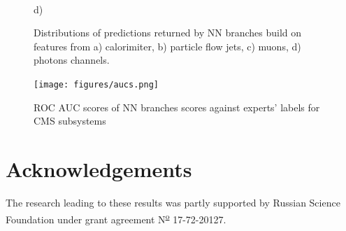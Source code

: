 \documentclass[a4paper]{jpconf}
\begin{document}
\begin{figure}[H]
\begin{minipage}[h!]{0.47\linewidth}
\end{minipage}
\hfill
\begin{minipage}[h!]{0.47\linewidth}
 \\ d) 
\end{minipage}
\caption{Distributions of predictions returned by NN branches build on features from a) calorimiter, b) particle flow jets, c) muons, d) photons
channels.}
\label{ris:experimentalcorrelationsignals}
\end{figure}


\begin{figure}[H]
\begin{center}
\texttt{[image: figures/aucs.png]}
\end{center}
\caption{\label{label}ROC AUC scores of NN branches scores against experts' labels for CMS subsystems}
\end{figure}

\section*{Acknowledgements}
The research leading to these results was partly supported by Russian Science Foundation under grant agreement N\textsuperscript{\underline{\scriptsize o}} 17-72-20127.
\end{document}
